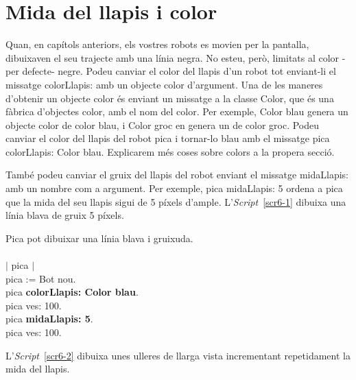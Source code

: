 \section{Mida del llapis i color}
Quan, en capítols anteriors, els vostres robots es movien per la pantalla, dibuixaven el seu trajecte amb una línia negra. No esteu, però, limitats al color -per defecte- negre. Podeu canviar el color del llapis d'un robot tot enviant-li el missatge \textsf{colorLlapis:} amb un objecte color d'argument. Una de les maneres d'obtenir un objecte color és enviant un missatge a la classe \textsf{Color}, que és una fàbrica d'objectes color, amb el nom del color. Per exemple, \textsf{Color blau} genera un objecte color de color blau, i \textsf{Color groc} en genera un de color groc. Podeu canviar el color del llapis del robot \textsf{pica} i tornar-lo blau amb el missatge \textsf{pica colorLlapis: Color blau}. Explicarem més coses sobre colors a la propera secció.

També podeu canviar el gruix del llapis del robot enviant el missatge \textsf{midaLlapis:} amb un nombre com a argument. Per exemple, \textsf{pica midaLlapis: 5} ordena a \textsf{pica}  que la mida del seu llapis sigui de 5 píxels d'ample. L'\emph{Script}~\ref{scr6-1} dibuixa una línia blava de gruix 5 píxels.
\begin{script}  Pica pot dibuixar una línia blava i gruixuda.
\textsf{\upshape
\\
\\$|$ pica $|$\\
pica := Bot nou.\\
pica {\bfseries colorLlapis: Color blau}.\\
pica ves: 100.\\
pica {\bfseries midaLlapis: 5}.\\
pica ves: 100.\\
}
\label{scr6-1}
\end{script}

\noindent
L'\emph{Script}~\ref{scr6-2} dibuixa unes ulleres de llarga vista incrementant repetidament la mida del llapis. 


